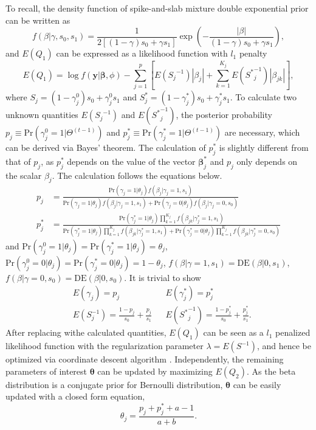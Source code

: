 \documentclass[AMA,STIX1COL,]{WileyNJD-v2}
\begin{document}
To recall, the density function of spike-and-slab mixture double
exponential prior can be written as \[
f(\beta|\gamma, s_0, s_1) = \frac{1}{2\left[(1-\gamma)s_0 + \gamma s_1\right]}\exp(-\frac{|\beta|}{(1-\gamma)s_0 + \gamma s_1}),
\] and \(E(Q_1)\) can be expressed as a likelihood function with \(l_1\)
penalty \begin{equation}\label{eq:Q1_CD}
E(Q_1) = \log f(\textbf{y}|\boldsymbol{\beta}, \phi) - \sum\limits_{j=1}^p\left[E({S_j}^{-1})|\beta_j|+\sum\limits_{k=1}^{K_j}E({S^{*}}^{-1}_{j})|\beta_{jk}|\right],
\end{equation} where
\(S_{j} = (1-\gamma^{0}_{j}) s_0 + \gamma^{0}_{j} s_1\) and
\(S^*_{j} = (1-\gamma^*_{j}) s_0 + \gamma^*_{j} s_1\). To calculate two
unknown quantities \(E({S_j}^{-1})\) and \(E({S^*}^{-1}_j)\), the
posterior probability
\(p_{j} \equiv \text{Pr}(\gamma^{0}_{j}=1|\Theta^{(t-1)})\) and
\(p_{j}^*\equiv \text{Pr}(\gamma^*_{j}=1|\Theta^{(t-1)})\) are
necessary, which can be derived via Bayes' theorem. The calculation of
\(p_j^*\) is slightly different from that of \(p_j\), as \(p_j^*\)
depends on the value of the vector \(\boldsymbol{\beta}^*_{j}\) and
\(p_j\) only depends on the scalar \(\beta_j\). The calculation follows
the equations below. \begin{align*}
p_{j} &= \frac{\text{Pr}(\gamma_{j} = 1|\theta_j)f(\beta_{j}|\gamma_{j}=1, s_1) }{\text{Pr}(\gamma_{j} = 1|\theta_j)f(\beta_{j}|\gamma_{j}=1, s_1) + \text{Pr}(\gamma_{j} = 0|\theta_j)f(\beta_{j}|\gamma_{j}=0, s_0)}\\
p^*_{j} &= \frac{\text{Pr}(\gamma^{*}_{j} = 1|\theta_j)\prod\limits_{k=1}^{K_j}f(\beta_{jk}|\gamma^{*}_{j}=1, s_1) }{\text{Pr}(\gamma^{*}_{j} = 1|\theta_j)\prod\limits_{k=1}^{K_j}f(\beta_{jk}|\gamma^{*}_{j}=1, s_1) + \text{Pr}(\gamma^{*}_{j} = 0|\theta_j)\prod\limits_{k=1}^{K_j}f(\beta_{jk}|\gamma^{*}_{j}=0, s_0)}
\end{align*} and
\(\text{Pr}(\gamma_{j}^{0} = 1|\theta_j) = \text{Pr}(\gamma_{j}^*= 1|\theta_j) = \theta_j\),
\(\text{Pr}(\gamma_{j}^{0} = 0|\theta_j) = \text{Pr}(\gamma_{j}^*= 0|\theta_j) = 1-\theta_j\),
\(f(\beta|\gamma=1, s_1) = \text{DE}(\beta|0 , s_1)\),
\(f(\beta|\gamma=0, s_0) = \text{DE}(\beta|0 , s_0)\). It is trivial to
show \begin{align}\label{eq:exp_scale}
&E(\gamma_{j})  = p_{j} & &E(\gamma^{*}_{j}) = p_{j}^{*}\nonumber\\
&E({S}^{-1}_{j}) = \frac{1-p_{j}}{s_0} + \frac{p_{j}}{s_1} & &E({S^*}^{-1}_{j}) = \frac{1-p_{j}^{*}}{s_0} + \frac{p_{j}^{*}}{s_1}.
\end{align} After replacing withe calculated quantities, \(E(Q_1)\) can
be seen as a \(l_1\) penalized likelihood function with the
regularization parameter \(\lambda = E(S^{-1})\), and hence be optimized
via coordinate descent algorithm \citep{Friedman2010}. Independently,
the remaining parameters of interest \(\boldsymbol{\theta}\) can be
updated by maximizing \(E(Q_2)\). As the beta distribution is a
conjugate prior for Bernoulli distribution, \(\boldsymbol{\theta}\) can
be easily updated with a closed form equation,
\begin{equation}\label{eq:update_theta}
\theta_j = \frac{p_j + p^*_{j} + a - 1 }{a + b}.
\end{equation}
\end{document}
